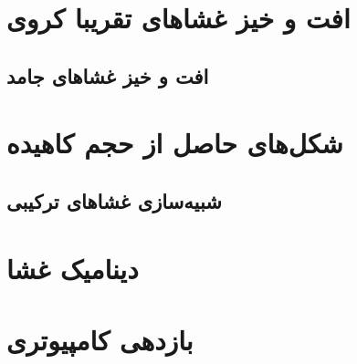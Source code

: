 \section{\label{sec:resultsBendingFluctuations}
افت و خیز غشا‌های تقریبا کروی
}


\subsection{
افت و خیز غشا‌های جامد
}


\section{\label{sec:larger shape changes}
شکل‌های حاصل از حجم کاهیده
}


\subsection{
شبیه‌سازی غشاهای ترکیبی
}


\section{\label{sec:dynamics}
دینامیک غشا
}

\section{\label{sec:computational efficiency}
بازدهی کامپیوتری
}




